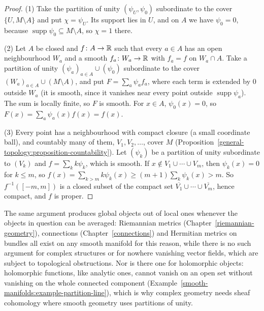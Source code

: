\begin{proof}
(1) Take the partition of unity $(\psi_U, \psi_0)$ subordinate to the cover $\{U, M \setminus A\}$ and put $\chi = \psi_U$. Its support lies in $U$, and on $A$
we have $\psi_0 = 0$, because $\operatorname{supp}\psi_0 \subseteq M \setminus A$, so $\chi = 1$ there.

(2) Let $A$ be closed and $f \colon A \to \mathbb{R}$ such that every $a \in A$ has an open neighbourhood $W_a$ and a smooth $f_a \colon W_a \to \mathbb{R}$ with $f_a = f$ on
$W_a \cap A$. Take a partition of unity $(\psi_a)_{a \in A} \cup (\psi_0)$ subordinate to the cover $(W_a)_{a \in A} \cup (M \setminus A)$, and put
$F = \sum_a\psi_af_a$, where each term is extended by $0$ outside $W_a$ (it is smooth, since it vanishes near every point outside $\operatorname{supp}\psi_a$).
The sum is locally finite, so $F$ is smooth. For $x \in A$, $\psi_0(x) = 0$, so $F(x) = \sum_a\psi_a(x)f(x) = f(x)$.

(3) Every point has a neighbourhood with compact closure (a small coordinate ball), and countably many of them, $V_1, V_2, \ldots$, cover $M$
(Proposition~\ref{general-topology:proposition-countability}). Let $(\psi_k)$ be a partition of unity subordinate to $(V_k)$ and $f = \sum_kk\psi_k$, which is
smooth. If $x \notin V_1 \cup \cdots \cup V_m$, then $\psi_k(x) = 0$ for $k \leq m$, so $f(x) = \sum_{k > m}k\psi_k(x) \geq (m + 1)\sum_k\psi_k(x) > m$. So
$f^{-1}([-m, m])$ is a closed subset of the compact set $\overline{V_1} \cup \cdots \cup \overline{V_m}$, hence compact, and $f$ is proper.
\end{proof}

\begin{remark}\label{smooth-manifolds:remark-patching}
The same argument produces global objects out of local ones whenever the objects in question can be averaged: Riemannian metrics (Chapter~\ref{riemannian-geometry}), connections
(Chapter~\ref{connections}) and Hermitian metrics on bundles all exist on any smooth manifold for this reason, while there is no such argument for complex structures or for nowhere vanishing vector fields,
which are subject to topological obstructions. Nor is there one for holomorphic objects: holomorphic functions, like analytic ones, cannot vanish on an open set
without vanishing on the whole connected component (Example~\ref{smooth-manifolds:example-partition-line}), which is why complex geometry needs sheaf
cohomology where smooth geometry uses partitions of unity.
\end{remark}

